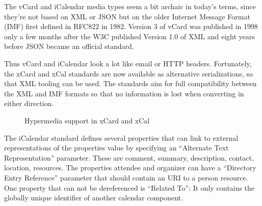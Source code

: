 \documentclass[12pt,a4paper]{scrartcl}		%
\begin{document}
The vCard and iCalendar media types seem a bit archaic in today's terms, since
they're not based on XML or JSON but on the older Internet Message
Format\cite{RFC5322} (IMF) first defined in RFC822 in 1982. Version 3 of vCard
was published in 1998\cite{RFC2425} only a few months after the W3C published
Version 1.0 of XML\cite{Paoli:98:XR} and eight years before JSON became an
official standard\cite{RFC4627}.

Thus vCard and iCalendar look a lot like email or HTTP headers. Fortunately, the
xCard\cite{RFC6351} and xCal\cite{RFC6321} standards are now available as
alternative serializations, so that XML tooling can be used. The standards aim
for full compatibility between the XML and IMF formats so that no information is
lost when converting in either direction.

\begin{figure}[tb]

  \caption{Hypermedia support in xCard and xCal}
\end{figure}

The iCalendar standard defines several properties that can link to external
representations of the properties value by specifying an ``Alternate Text
Representation'' parameter. These are comment, summary, description, contact,
location, resources. The properties attendee and organizer can have a
``Directory Entry Reference'' parameter that should contain an URI to a person
resource. One property that can not be dereferenced is ``Related To'': It only
contains the globally unique identifier of another calendar component.
\end{document}

